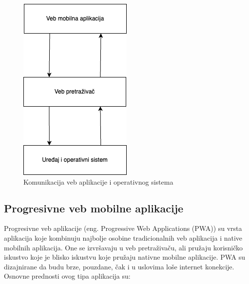 \documentclass[12pt,oneside]{memoir}
\begin{document}
\begin{figure}[h]
    \centering
    \includegraphics[scale=0.5]{docs/images/chapterTwo/vebMobilnaAplikacija.png}
    \caption{Komunikacija veb aplikacije i operativnog sistema}
    \label{fig:vebMobilnaAplikacija}
\end{figure}

\subsection{Progresivne veb mobilne aplikacije}

Progresivne veb aplikacije (eng. Progressive Web Applications (PWA)) su vrsta aplikacija koje kombinuju najbolje osobine tradicionalnih veb aplikacija i native mobilnih aplikacija. One se izvršavaju u veb pretraživaču, ali pružaju korisničko iskustvo koje je blisko iskustvu koje pružaju nativne mobilne aplikacije. PWA su dizajnirane da budu brze, pouzdane, čak i u uslovima loše internet konekcije. Osnovne prednosti ovog tipa aplikacija su:
\end{document}
